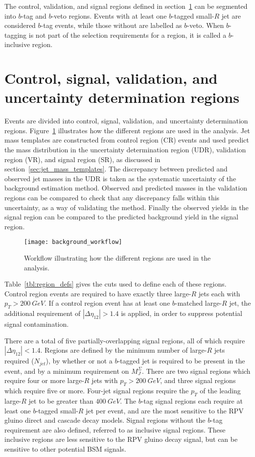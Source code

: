 The control, validation, and signal regions defined in section~\ref{sec:region_defs} can be segmented into $b$-tag and $b$-veto regions.
Events with at least one $b$-tagged small-$R$ jet are considered $b$-tag events, while those without are labelled as $b$-veto.
When $b$-tagging is not part of the selection requirements for a region, it is called a $b$-inclusive region.

\section{Control, signal, validation, and uncertainty determination regions} \label{sec:region_defs}
Events are divided into control, signal, validation, and uncertainty determination regions.
Figure~\ref{fig:workflow} illustrates how the different regions are used in the analysis.
Jet mass templates are constructed from control region (CR) events and used predict the mass distribution in the uncertainty determination region (UDR), validation region (VR), and signal region (SR), as discussed in section~\ref{sec:jet_mass_templates}.
The discrepancy between predicted and observed jet masses in the UDR is taken as the systematic uncertainty of the background estimation method.
Observed and predicted masses in the validation regions can be compared to check that any discrepancy falls within this uncertainty, as a way of validating the method.
Finally the observed yields in the signal region can be compared to the predicted background yield in the signal region.

\begin{figure}[!ht]
    \centering
    \texttt{[image: background\_workflow]}
    \caption{Workflow illustrating how the different regions are used in the analysis.}
    \label{fig:workflow}
\end{figure}

Table~\ref{tbl:region_defs} gives the cuts used to define each of these regions.
Control region events are required to have exactly three large-$R$ jets each with $p_{T}>200~GeV$.
If a control region event has at least one $b$-matched large-$R$ jet, the additional requirement of $|\Delta\eta_{12}|>1.4$ is applied, in order to suppress potential signal contamination.

There are a total of five partially-overlapping signal regions, all of which require $|\Delta\eta_{12}|<1.4$.
Regions are defined by the minimum number of large-$R$ jets required ($N_{jet}$), by whether or not a $b$-tagged jet is required to be present in the event, and by a minimum requirement on $M_{J}^{\Sigma}$.
There are two signal regions which require four or more large-$R$ jets with $p_{T}>200~GeV$, and three signal regions which require five or more.
Four-jet signal regions require the $p_T$ of the leading large-$R$ jet to be greater than $400~GeV$.
The $b$-tag signal regions each require at least one $b$-tagged small-$R$ jet per event, and are the most sensitive to the RPV gluino direct and cascade decay models.
Signal regions without the $b$-tag requirement are also defined, referred to as inclusive signal regions.
These inclusive regions are less sensitive to the RPV gluino decay signal, but can be sensitive to other potential BSM signals.

